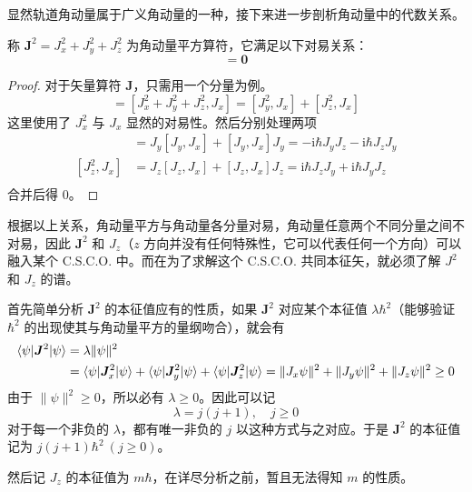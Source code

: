 \documentclass[cn,10pt,math=newtx,citestyle=gb7714-2015,bibstyle=gb7714-2015]{elegantbook}
\def\bm{\boldsymbol}
\def\i{\mathrm i}
\begin{document}
显然轨道角动量属于广义角动量的一种，接下来进一步剖析角动量中的代数关系。

\begin{theorem}[角动量平方算符的对易关系]\label{thm:anglr_mmntm_sqr_cmmt}
   称 $\bm J^2 = J_x^2+J_y^2+J_z^2$ 为角动量平方算符，它满足以下对易关系：
   \begin{equation}
       [\bm J^2,\bm J]=\bm 0
   \end{equation}
\end{theorem}
\begin{proof}
    对于矢量算符 $\bm J$，只需用一个分量为例。
    \begin{equation}
        [\bm J^2,J_x] = [J_x^2+J_y^2+J_z^2,J_x] = [J_y^2,J_x]+[J_z^2,J_x]
    \end{equation}
    这里使用了 $J_x^2$ 与 $J_x$ 显然的对易性。然后分别处理两项
    \begin{align}
        [J_y^2,J_x] & = J_y[J_y,J_x] + [J_y,J_x]J_y=-\i\hbar J_yJ_z-\i\hbar J_zJ_y\\
        [J_z^2,J_x] & = J_z[J_z,J_x] + [J_z,J_x]J_z=\i\hbar J_zJ_y+\i\hbar J_yJ_z\\
    \end{align}
    合并后得 0。
\end{proof}
    
根据以上关系，角动量平方与角动量各分量对易，角动量任意两个不同分量之间不对易，因此 $\bm J^2$ 和 $J_z$（$z$ 方向并没有任何特殊性，它可以代表任何一个方向）可以融入某个 C.S.C.O. 中。而在为了求解这个 C.S.C.O. 共同本征矢，就必须了解 $J^2$ 和 $J_z$ 的谱。

首先简单分析 $\bm J^2$ 的本征值应有的性质，如果 $\bm J^2$ 对应某个本征值 $\lambda\hbar^2$（能够验证 $\hbar^2$ 的出现使其与角动量平方的量纲吻合），就会有
\begin{align}
    \braket{\psi|\bm J^2|\psi} & = \lambda\|\psi\|^2\nonumber\\&
    = \braket{\psi|\bm J^2_x|\psi}+\braket{\psi|\bm J^2_y|\psi}+\braket{\psi|\bm J^2_z|\psi} = \|J_x\psi\|^2+\|J_y\psi\|^2+\|J_z\psi\|^2\ge 0
\end{align}
由于 $\|\psi\|^2 \ge 0$，所以必有 $\lambda\ge 0$。因此可以记
\begin{equation}
    \lambda = j(j+1),\quad j\ge 0
\end{equation}
对于每一个非负的 $\lambda$，都有唯一非负的 $j$ 以这种方式与之对应。于是 $\bm J^2$ 的本征值记为 $j(j+1)\hbar^2\ (j\ge 0)$。

然后记 $J_z$ 的本征值为 $m\hbar$，在详尽分析之前，暂且无法得知 $m$ 的性质。
\end{document}
